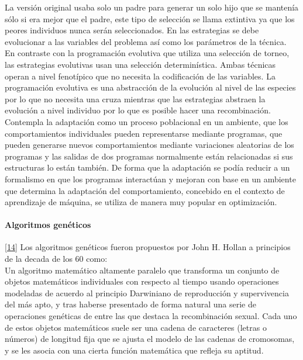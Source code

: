 			La versión original usaba solo un padre para generar un solo hijo que se mantenía sólo si era mejor que el padre, este tipo de selección se llama extintiva ya que los peores individuos nunca serán seleccionados. En las estrategias se debe evolucionar a las variables del problema así como los parámetros de la técnica.\\
			
			En contraste con la programación evolutiva que utiliza una selección de torneo, las estrategias evolutivas usan una selección determinística. Ambas técnicas operan a nivel fenotípico que no necesita la codificación de las variables. La programación evolutiva es una abstracción de la evolución al nivel de las especies por lo que no necesita una cruza mientras que las estrategias abstraen la evolución a nivel individuo por lo que es posible hacer una recombinación.\\

			Contempla la adaptación como un proceso poblacional en un ambiente, que los comportamientos individuales pueden representarse mediante programas, que pueden generarse nuevos comportamientos mediante variaciones aleatorias de los programas y las salidas de dos programas normalmente están relacionadas si sus estructuras lo están también. De forma que la adaptación se podía reducir a un formalismo en que los programas interactúan y mejoran con base en un ambiente que determina la adaptación del comportamiento, concebido en el contexto de aprendizaje de máquina, se utiliza de manera muy popular en optimización.\\


			\paragraph{Algoritmos genéticos}\ref{14}
			Los algoritmos genéticos fueron propuestos por John H. Hollan a principios de la decada de los 60 como: \\
				Un algoritmo matemático altamente paralelo que transforma un conjunto de objetos matemáticos individuales con respecto al tiempo usando operaciones modeladas de acuerdo al principio Darwiniano de reproducción y supervivencia del más apto, y tras haberse presentado de forma natural una serie de operaciones genéticas de entre las que destaca la  recombinación sexual. Cada uno de estos objetos matemáticos suele ser una cadena de caracteres (letras o números) de longitud fija que se ajusta el modelo de las cadenas de cromosomas, y se les asocia con una cierta función matemática que refleja su aptitud.\\

